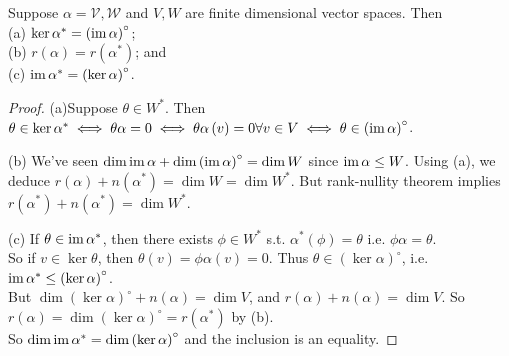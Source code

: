 \documentclass[a4paper]{article}
\begin{document}
\begin{lemma}
Suppose $\alpha = \mathcal{V,W}$ and $V,W$ are finite dimensional vector spaces. Then\\
(a) $\ker \alpha^* = \left(\operatorname{im}\alpha\right)^\circ$;\\
(b) $r\left(\alpha\right) = r\left(\alpha^*\right)$; and\\
(c) $\operatorname{im}\alpha^* = \left(\ker \alpha\right)^\circ$.
\begin{proof}
(a)Suppose $\theta \in W^*$. Then $\theta \in \ker \alpha^*\iff\theta\alpha = 0 \iff \theta\alpha\left(v\right) = 0 \forall v \in V \iff \theta\in\left(\operatorname{im}\alpha\right)^\circ$.

(b) We've seen $\dim\operatorname{im}\alpha+\dim\left(\operatorname{im}\alpha\right)^\circ = \dim W$ since $\operatorname{im} \alpha \leq W$. Using (a), we deduce $r\left(\alpha\right) + n\left(\alpha^*\right) = \dim W = \dim W^*$. But rank-nullity theorem implies $r\left(\alpha^*\right) + n\left(\alpha^*\right) = \dim W^*$.

(c) If $\theta \in \operatorname{im}\alpha^*$, then there exists $\phi\in W^*$ s.t. $\alpha^*\left(\phi\right) = \theta$ i.e. $\phi\alpha = \theta$.\\
So if $v \in \ker\theta$, then $\theta\left(v\right) = \phi\alpha\left(v\right) = 0$. Thus $\theta \in \left(\ker\alpha\right)^\circ$, i.e. $\operatorname{im}\alpha^* \leq \left(\ker\alpha\right)^\circ$.\\
But $\dim\left(\ker\alpha\right)^\circ + n\left(\alpha\right) = \dim V$, and $r\left(\alpha\right) + n\left(\alpha\right) = \dim V$. So $r\left(\alpha\right) = \dim\left(\ker\alpha\right)^\circ = r\left(\alpha^*\right)$ by (b).\\
So $\dim\operatorname{im}\alpha^* = \dim\left(\ker\alpha\right)^\circ$ and the inclusion is an equality.
\end{proof}
\end{lemma}
\end{document}
